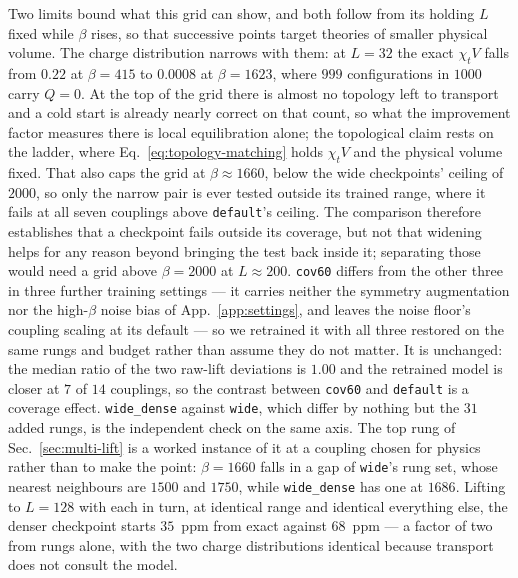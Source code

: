 \documentclass[prd, twocolumn, superscriptaddress, nofootinbib,floatfix]{revtex4-2}
\DeclareRobustCommand{\Eq}[1]{Eq.~\eqref{eq:#1}}
\DeclareRobustCommand{\app}[1]{App.~\ref{app:#1}}
\DeclareRobustCommand{\sect}[1]{Sec.~\ref{sec:#1}}
\begin{document}
Two limits bound what this grid can show, and both follow from its holding $L$
fixed while $\beta$ rises, so that successive points target theories of smaller
physical volume. The charge distribution narrows with them: at $L=32$ the exact
$\chi_t V$ falls from $0.22$ at $\beta=415$ to $0.0008$ at $\beta=1623$, where
$999$ configurations in $1000$ carry $Q=0$. At the top of the grid there is
almost no topology left to transport and a cold start is already nearly correct
on that count, so what the improvement factor measures there is local
equilibration alone; the topological claim rests on the ladder, where
\Eq{topology-matching} holds $\chi_t V$ and the physical volume fixed. That also
caps the grid at $\beta\approx1660$, below the wide checkpoints' ceiling of
$2000$, so only the narrow pair is ever tested outside its trained range, where
it fails at all seven couplings above \texttt{default}'s ceiling. The comparison
therefore establishes that a checkpoint fails outside its coverage, but not that
widening helps for any reason beyond bringing the test back inside it;
separating those would need a grid above $\beta=2000$ at $L\approx200$.
\texttt{cov60} differs from the other three in three further training settings
--- it carries neither the symmetry augmentation nor the high-$\beta$ noise bias
of \app{settings}, and leaves the noise floor's coupling scaling at its default
--- so we retrained it with all three restored on the same rungs
and budget rather than assume they do not matter. It is unchanged: the median
ratio of the two raw-lift deviations is $1.00$ and the retrained model is closer
at $7$ of $14$ couplings, so the contrast between \texttt{cov60} and
\texttt{default} is a coverage effect. \texttt{wide\_dense} against
\texttt{wide}, which differ by nothing but the $31$ added rungs, is the
independent check on the same axis. The top rung of \sect{multi-lift} is a
worked instance of it at a coupling chosen for physics rather than to make the
point: $\beta=1660$ falls in a gap of \texttt{wide}'s rung set, whose nearest
neighbours are $1500$ and $1750$, while \texttt{wide\_dense} has one at $1686$.
Lifting to $L=128$ with each in turn, at identical range and identical
everything else, the denser checkpoint starts $35$~ppm from exact against
$68$~ppm --- a factor of two from rungs alone, with the two charge
distributions identical because transport does not consult the model.
\end{document}
